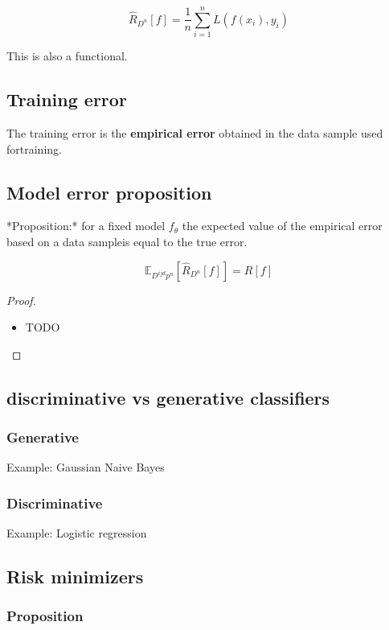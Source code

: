 \[\hat{R}_{D^n}[f] = \frac{1}{n} \sum_{i=1}^n L(f(x_i), y_i)
\]

This is also a functional.

\subsection{Training error}

The training error is the \textbf{empirical error} obtained in the data
sample used fortraining.

\subsection{Model error proposition}

*Proposition:* for a fixed model \(f_θ\) the expected value of the
empirical error based on a data sampleis equal to the true error.

\[\mathds{E}_{D^{ijd}p^n}[\hat{R}_{D^n}[f]] = R[f]
\]

\begin{proof}

	\begin{itemize}
		\item
		      TODO
	\end{itemize}
\end{proof}

\subsection{discriminative vs generative classifiers}

\subsubsection{Generative}

Example: Gaussian Naive Bayes

\subsubsection{Discriminative}

Example: Logistic regression

\subsection{Risk minimizers}

\subsubsection{Proposition}

